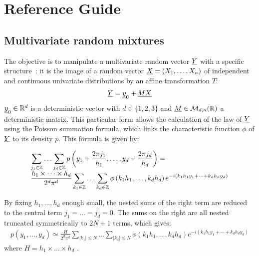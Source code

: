 



\section{Reference Guide}

\subsection{Multivariate random mixtures}

The objective is to manipulate a multivariate random vector ${\underline{Y}}$ with a specific structure~:
it is the image of a random vector ${\underline{X}} = (X_1, \hdots, X_n) $ of independent and continuous univariate distributions by an affine transformation $T$:
\begin{align}\label{defY}
  {\underline{Y}}={\underline{y}}_0+{\underline{M}}{\underline{X}}
\end{align}
${\underline{y}}_0\in\mathbb{R}^d$ is a deterministic vector with $d\in\{1,2,3\}$ and ${\underline{M}}\in\mathcal{M}_{d,n}(\mathbb{R})$
a deterministic matrix. This particular form allows the calculation of the law of ${\underline{Y}} $ using the Poisson summation formula, which links the characteristic
function $\phi $ of ${\underline{Y}}$ to its density $p$. This formula is given by:

\begin{align}\label{poissonND}
  \begin{array}{p{\textwidth}}
    \multicolumn{1}{l}{\displaystyle\sum_{j_1\in\mathbb{Z}}\hdots\sum_{j_d\in\mathbb{Z}}p\left(y_1+\frac{2\pi j_1}{h_1},\hdots,y_d+\frac{2\pi j_d}{h_d}\right)= }\\
    \multicolumn{1}{r}{\displaystyle\frac{h_1\times\cdots\times h_d}{2^d\pi^d}\sum_{k_1\in\mathbb{Z}}\hdots\sum_{k_d\in\mathbb{Z}}\phi\left(k_1h_1,\hdots,k_dh_d\right)e^{-i(k_1h_1y_1+\cdots+k_dh_dy_d)}}
  \end{array}
\end{align}

By fixing $h_1,\hdots,h_d$ enough small, the nested sums of the right term are reduced to the central term $j_1=\hdots=j_d = 0$.
The sums on the right are all nested truncated symmetrically to $ 2N +1 $ terms, which gives:
\begin{align}
  p\left(y_1,\hdots,y_d\right)\simeq\frac{H}{2^d\pi^d}\sum_{|k_1|\leq N}\hdots\sum_{|k_d|\leq N}\phi\left(k_1h_1,\hdots,k_dh_d\right)e^{-i(k_1h_1y_1+\cdots+k_dh_dy_d)}
\end{align}
where $H = h_1\times\hdots\times h_d$ .

